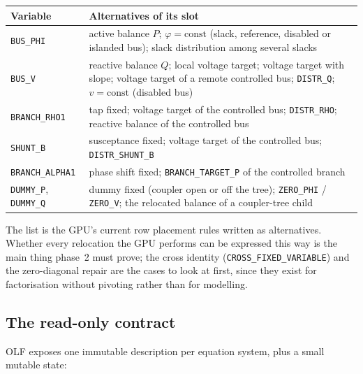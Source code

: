 \documentclass[11pt,a4paper]{article}
\newcommand{\code}[1]{\texttt{\small #1}}
\begin{document}
\begin{center}
\small
\begin{tabularx}{\textwidth}{>{\raggedright\arraybackslash}p{2.6cm}>{\raggedright\arraybackslash}X}
\toprule
Variable & Alternatives of its slot \\
\midrule
\code{BUS\_PHI} & active balance $P$; $\varphi = \text{const}$ (slack, reference, disabled or islanded bus); slack distribution among several slacks \\
\code{BUS\_V} & reactive balance $Q$; local voltage target; voltage target with slope; voltage target of a remote controlled bus; \code{DISTR\_Q}; $v = \text{const}$ (disabled bus) \\
\code{BRANCH\_RHO1} & tap fixed; voltage target of the controlled bus; \code{DISTR\_RHO}; reactive balance of the controlled bus \\
\code{SHUNT\_B} & susceptance fixed; voltage target of the controlled bus; \code{DISTR\_SHUNT\_B} \\
\code{BRANCH\_ALPHA1} & phase shift fixed; \code{BRANCH\_TARGET\_P} of the controlled branch \\
\code{DUMMY\_P}, \code{DUMMY\_Q} & dummy fixed (coupler open or off the tree); \code{ZERO\_PHI} / \code{ZERO\_V}; the relocated balance of a coupler-tree child \\
\bottomrule
\end{tabularx}
\end{center}

The list is the GPU's current row placement rules written as alternatives. Whether every
relocation the GPU performs can be expressed this way is the main thing phase~2 must
prove; the cross identity (\code{CROSS\_FIXED\_VARIABLE}) and the zero-diagonal repair
are the cases to look at first, since they exist for factorisation without pivoting
rather than for modelling.

\subsection{The read-only contract}

OLF exposes one immutable description per equation system, plus a small mutable state:
\end{document}
